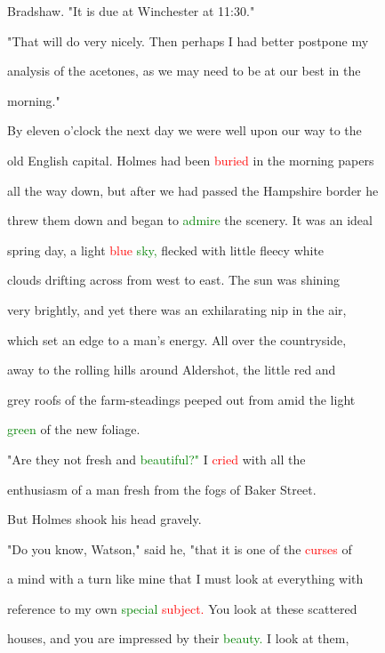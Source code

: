  Bradshaw. "It is due at Winchester at 11:30."



 "That will do very nicely. Then perhaps I had better postpone my

 analysis of the acetones, as we may need to be at our best in the

 morning."



 By eleven o'clock the next day we were well upon our way to the

 old English capital. Holmes had been \textcolor{red}{buried} in the morning papers

 all the way down, but after we had passed the Hampshire border he

 threw them down and began to \textcolor{green}{admire} the scenery. It was an ideal

 spring day, a light \textcolor{red}{blue} \textcolor{green}{sky,} flecked with little fleecy \textcolor{BurntOrange}{white}

 clouds drifting across from west to east. The \textcolor{BurntOrange}{sun} was shining

 very brightly, and yet there was an exhilarating nip in the air,

 which set an edge to a man's energy. All over the countryside,

 away to the rolling hills around Aldershot, the little red and

 grey roofs of the farm-steadings peeped out from amid the light

 \textcolor{green}{green} of the new foliage.



 "Are they not fresh and \textcolor{green}{beautiful?"} I \textcolor{red}{cried} with all the

 \textcolor{BurntOrange}{enthusiasm} of a man fresh from the fogs of Baker Street.



 But Holmes shook his head gravely.



 "Do you know, Watson," said he, "that it is one of the \textcolor{red}{curses} of

 a mind with a turn like mine that I must look at everything with

 reference to my own \textcolor{green}{special} \textcolor{red}{subject.} You look at these scattered

 houses, and you are impressed by their \textcolor{green}{beauty.} I look at them,


